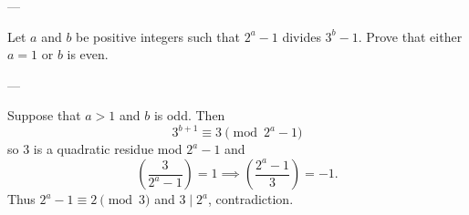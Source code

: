 
---

Let $a$ and $b$ be positive integers such that $2^a-1$ divides $3^b-1$. Prove that either $a=1$ or $b$ is even.

---

Suppose that $a>1$ and $b$ is odd. Then \[3^{b+1}\equiv3\pmod{2^a-1}\]
so $3$ is a quadratic residue mod $2^a-1$ and \[\left(\frac3{2^a-1}\right)=1\implies\left(\frac{2^a-1}3\right)=-1.\]
Thus $2^a-1\equiv2\pmod3$ and $3\mid 2^a$, contradiction.

